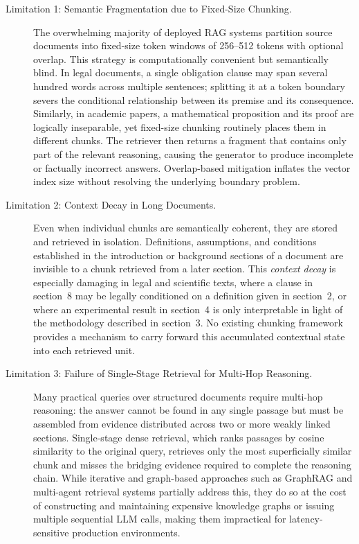 \documentclass[12pt,a4paper]{article}
\begin{document}
\begin{description}
\item[Limitation 1: Semantic Fragmentation due to Fixed-Size Chunking.]
The overwhelming majority of deployed RAG systems partition source documents
into fixed-size token windows of 256--512 tokens with optional overlap.
This strategy is computationally convenient but semantically blind. In legal
documents, a single obligation clause may span several hundred words across
multiple sentences; splitting it at a token boundary severs the conditional
relationship between its premise and its consequence. Similarly, in academic
papers, a mathematical proposition and its proof are logically inseparable,
yet fixed-size chunking routinely places them in different chunks. The
retriever then returns a fragment that contains only part of the relevant
reasoning, causing the generator to produce incomplete or factually incorrect
answers. Overlap-based mitigation inflates the vector index size without
resolving the underlying boundary problem.

\item[Limitation 2: Context Decay in Long Documents.]
Even when individual chunks are semantically coherent, they are stored and
retrieved in isolation. Definitions, assumptions, and conditions established
in the introduction or background sections of a document are invisible to a
chunk retrieved from a later section. This \emph{context decay} is especially
damaging in legal and scientific texts, where a clause in section~8 may be
legally conditioned on a definition given in section~2, or where an
experimental result in section~4 is only interpretable in light of the
methodology described in section~3. No existing chunking framework provides
a mechanism to carry forward this accumulated contextual state into each
retrieved unit.

\item[Limitation 3: Failure of Single-Stage Retrieval for Multi-Hop Reasoning.]
Many practical queries over structured documents require multi-hop reasoning:
the answer cannot be found in any single passage but must be assembled from
evidence distributed across two or more weakly linked sections. Single-stage
dense retrieval, which ranks passages by cosine similarity to the original
query, retrieves only the most superficially similar chunk and misses the
bridging evidence required to complete the reasoning chain. While iterative
and graph-based approaches such as GraphRAG and multi-agent retrieval systems
partially address this, they do so at the cost of constructing and maintaining
expensive knowledge graphs or issuing multiple sequential LLM calls, making
them impractical for latency-sensitive production environments.
\end{description}
\end{document}
